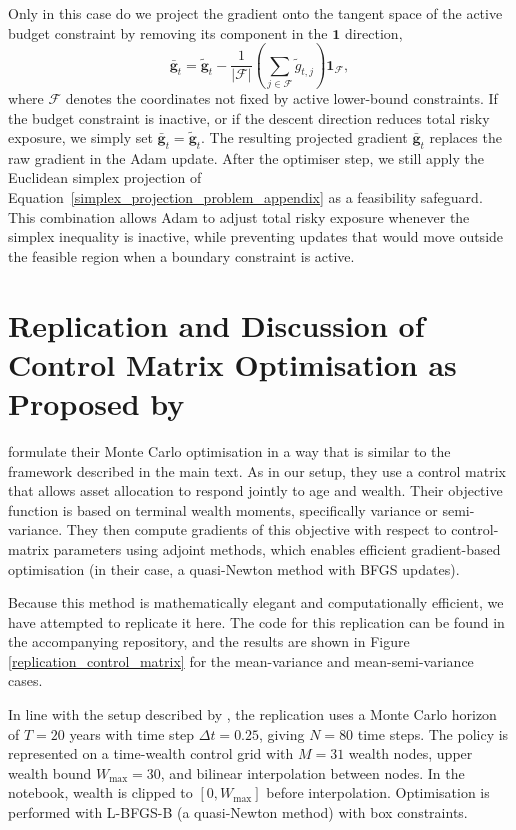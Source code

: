 \documentclass[11pt]{article}
\begin{document}
Only in this case do we project the gradient onto the tangent space of the active budget constraint by removing its component in the \(\mathbf{1}\) direction,
\begin{equation}
\bar{\mathbf g}_{t}
=
\tilde{\mathbf g}_{t}
-
\frac{1}{|\mathcal F|}
\left(
\sum_{j\in\mathcal F}\tilde g_{t,j}
\right)
\mathbf 1_{\mathcal F},
\end{equation}
where \(\mathcal F\) denotes the coordinates not fixed by active lower-bound constraints. If the budget constraint is inactive, or if the descent direction reduces total risky exposure, we simply set \(\bar{\mathbf g}_{t}=\tilde{\mathbf g}_{t}\). The resulting projected gradient \(\bar{\mathbf g}_{t}\) replaces the raw gradient in the Adam update. After the optimiser step, we still apply the Euclidean simplex projection of Equation~\ref{simplex_projection_problem_appendix} as a feasibility safeguard. This combination allows Adam to adjust total risky exposure whenever the simplex inequality is inactive, while preventing updates that would move outside the feasible region when a boundary constraint is active.
\clearpage

\section{Replication and Discussion of Control Matrix Optimisation as Proposed by \textcite{Makinen2024}}

\textcite{Makinen2024} formulate their Monte Carlo optimisation in a way that is similar to the framework described in the main text. As in our setup, they use a control matrix that allows asset allocation to respond jointly to age and wealth. Their objective function is based on terminal wealth moments, specifically variance or semi-variance. They then compute gradients of this objective with respect to control-matrix parameters using adjoint methods, which enables efficient gradient-based optimisation (in their case, a quasi-Newton method with BFGS updates).

Because this method is mathematically elegant and computationally efficient, we have attempted to replicate it here. The code for this replication can be found in the accompanying repository, and the results are shown in Figure \ref{replication_control_matrix} for the mean-variance and mean-semi-variance cases.

In line with the setup described by \textcite{Makinen2024}, the replication uses a Monte Carlo horizon of $T = 20$ years with time step $\Delta t = 0.25$, giving $N = 80$ time steps. The policy is represented on a time-wealth control grid with $M = 31$ wealth nodes, upper wealth bound $W_{\max}=30$, and bilinear interpolation between nodes. In the notebook, wealth is clipped to $[0, W_{\max}]$ before interpolation. Optimisation is performed with L-BFGS-B (a quasi-Newton method) with box constraints.
\end{document}
